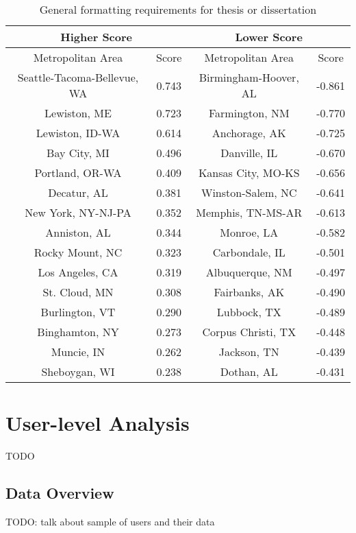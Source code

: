 \documentclass[12pt,oneside, letterpaper]{book}
\begin{document}
\begin{table}[h!]
    \centering
    \caption{General formatting requirements for thesis or dissertation}
    \begin{tabular}{| c | c | c | c |}
    \hline
    \multicolumn{2}{|c|}{Higher Score} & \multicolumn{2}{|c|}{Lower Score} \\ \hline
    Metropolitan Area & Score & Metropolitan Area & Score \\ \hline
    Seattle-Tacoma-Bellevue, WA & 0.743 & Birmingham-Hoover, AL & -0.861 \\ \hline
    Lewiston, ME & 0.723 & Farmington, NM & -0.770 \\ \hline
    Lewiston, ID-WA & 0.614 & Anchorage, AK & -0.725 \\ \hline
    Bay City, MI & 0.496 & Danville, IL & -0.670 \\ \hline
    Portland, OR-WA & 0.409 & Kansas City, MO-KS & -0.656 \\ \hline
    Decatur, AL & 0.381 & Winston-Salem, NC & -0.641 \\ \hline
    New York, NY-NJ-PA & 0.352 & Memphis, TN-MS-AR & -0.613 \\ \hline
    Anniston, AL & 0.344 & Monroe, LA & -0.582 \\ \hline
    Rocky Mount, NC & 0.323 & Carbondale, IL & -0.501 \\ \hline
    Los Angeles, CA & 0.319 & Albuquerque, NM & -0.497 \\ \hline
    St. Cloud, MN & 0.308 & Fairbanks, AK & -0.490 \\ \hline
    Burlington, VT & 0.290 & Lubbock, TX & -0.489 \\ \hline
    Binghamton, NY & 0.273 & Corpus Christi, TX & -0.448 \\ \hline
    Muncie, IN & 0.262 & Jackson, TN & -0.439 \\ \hline
    Sheboygan, WI & 0.238 & Dothan, AL & -0.431 \\ \hline
	\end{tabular}
	\label{table:table-5}
\end{table}

\chapter{User-level Analysis}
\par TODO

\section{Data Overview}
\par TODO: talk about sample of users and their data
\end{document}
